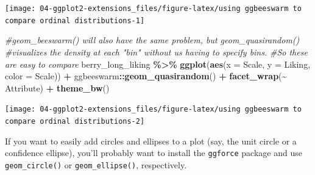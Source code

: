 \documentclass[
]{book}
\newenvironment{Shaded}{\begin{snugshade}}{\end{snugshade}}
\newcommand{\AttributeTok}[1]{\textcolor[rgb]{0.13,0.29,0.53}{#1}}
\newcommand{\CommentTok}[1]{\textcolor[rgb]{0.56,0.35,0.01}{\textit{#1}}}
\newcommand{\FunctionTok}[1]{\textcolor[rgb]{0.13,0.29,0.53}{\textbf{#1}}}
\newcommand{\NormalTok}[1]{#1}
\newcommand{\SpecialCharTok}[1]{\textcolor[rgb]{0.81,0.36,0.00}{\textbf{#1}}}
\begin{document}
\begin{center}\texttt{[image: 04-ggplot2-extensions\_files/figure-latex/using ggbeeswarm to compare ordinal distributions-1]} \end{center}

\begin{Shaded}
\begin{Highlighting}[]
\CommentTok{\#geom\_beeswarm() will also have the same problem, but geom\_quasirandom()}
\CommentTok{\#visualizes the density at each "bin" without us having to specify bins.}
\CommentTok{\#So these are easy to compare}
\NormalTok{berry\_long\_liking }\SpecialCharTok{\%\textgreater{}\%}
  \FunctionTok{ggplot}\NormalTok{(}\FunctionTok{aes}\NormalTok{(}\AttributeTok{x =}\NormalTok{ Scale, }\AttributeTok{y =}\NormalTok{ Liking, }\AttributeTok{color =}\NormalTok{ Scale)) }\SpecialCharTok{+}
\NormalTok{  ggbeeswarm}\SpecialCharTok{::}\FunctionTok{geom\_quasirandom}\NormalTok{() }\SpecialCharTok{+}
  \FunctionTok{facet\_wrap}\NormalTok{(}\SpecialCharTok{\textasciitilde{}}\NormalTok{ Attribute) }\SpecialCharTok{+}
  \FunctionTok{theme\_bw}\NormalTok{()}
\end{Highlighting}
\end{Shaded}

\begin{center}\texttt{[image: 04-ggplot2-extensions\_files/figure-latex/using ggbeeswarm to compare ordinal distributions-2]} \end{center}

If you want to easily add circles and ellipses to a plot (say, the unit circle or a confidence ellipse), you'll probably want to install the \texttt{ggforce} package and use \texttt{geom\_circle()} or \texttt{geom\_ellipse()}, respectively.
\end{document}
